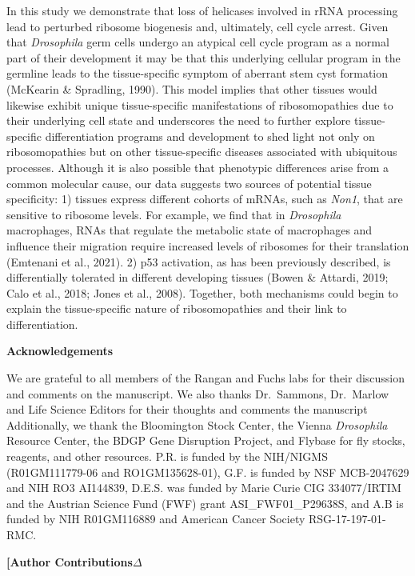 \documentclass[12pt,oneside]{reedthesis}
\begin{document}
In this study we demonstrate that loss of helicases involved in rRNA
processing lead to perturbed ribosome biogenesis and, ultimately, cell
cycle arrest. Given that \emph{Drosophila} germ cells undergo an atypical
cell cycle program as a normal part of their development it may be that
this underlying cellular program in the germline leads to the
tissue-specific symptom of aberrant stem cyst formation
(McKearin \& Spradling, 1990). This model implies that other tissues would
likewise exhibit unique tissue-specific manifestations of
ribosomopathies due to their underlying cell state and underscores the
need to further explore tissue-specific differentiation programs and
development to shed light not only on ribosomopathies but on other
tissue-specific diseases associated with ubiquitous processes. Although
it is also possible that phenotypic differences arise from a common
molecular cause, our data suggests two sources of potential tissue
specificity: 1) tissues express different cohorts of mRNAs, such as
\emph{Non1}, that are sensitive to ribosome levels. For example, we find that
in \emph{Drosophila} macrophages, RNAs that regulate the metabolic state of
macrophages and influence their migration require increased levels of
ribosomes for their translation (Emtenani et al., 2021).
2) p53 activation, as has been previously described, is differentially
tolerated in different developing tissues
(Bowen \& Attardi, 2019; Calo et al., 2018; Jones et al., 2008). Together, both
mechanisms could begin to explain the tissue-specific nature of
ribosomopathies and their link to differentiation.

\textbf{{Acknowledgements}}

We are grateful to all members of the Rangan and Fuchs labs for their
discussion and comments on the manuscript. We also thanks Dr.~Sammons,
Dr.~Marlow and Life Science Editors for their thoughts and comments the
manuscript Additionally, we thank the Bloomington Stock Center, the
Vienna \emph{Drosophila} Resource Center, the BDGP Gene Disruption Project,
and Flybase for fly stocks, reagents, and other resources. P.R. is
funded by the NIH/NIGMS (R01GM111779-06 and RO1GM135628-01), G.F. is
funded by NSF MCB-2047629 and NIH RO3 AI144839, D.E.S. was funded by
Marie Curie CIG 334077/IRTIM and the Austrian Science Fund (FWF) grant
ASI\_FWF01\_P29638S, and A.B is funded by NIH R01GM116889 and American
Cancer Society RSG-17-197-01-RMC.

\textbf{{[}Author Contributions\(\Delta\)}
\end{document}
